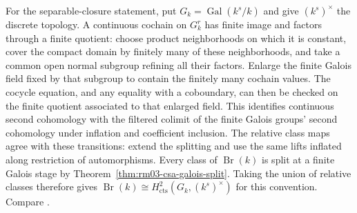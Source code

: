 \begin{remark}
For the separable-closure statement, put \(G_k=\operatorname{Gal}(k^s/k)\)
and give \((k^s)^\times\) the discrete topology. A continuous cochain
on \(G_k^r\) has finite image and factors through a finite quotient:
choose product neighborhoods on which it is constant, cover the
compact domain by finitely many of these neighborhoods, and take a
common open normal subgroup refining all their factors. Enlarge the
finite Galois field fixed by that subgroup to contain the finitely
many cochain values. The cocycle equation, and any equality with a
coboundary, can then be checked on the finite quotient associated to
that enlarged field. This identifies continuous second cohomology
with the filtered colimit of the finite Galois groups'
second cohomology under inflation and coefficient inclusion.
The relative class maps agree with these transitions: extend the
splitting and use the same lifts inflated along restriction of
automorphisms. Every class of \(\operatorname{Br}(k)\) is split
at a finite Galois stage by Theorem~\ref{thm:rm03-csa-galois-split}.
Taking the union of relative classes therefore gives
\(\operatorname{Br}(k)\cong H^2_{\mathrm{cts}}(G_k,(k^s)^\times)\)
for this convention. Compare \cite[Theorem~59.61.6]{stacksdescent}.
\end{remark}
